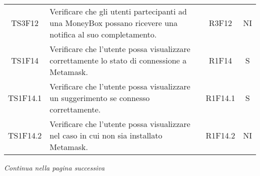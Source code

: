 \begin{table}[H]
\begin{tabular}{c|p{8cm}|c|c}
    TS3F12    & Verificare che gli utenti partecipanti ad una MoneyBox\glo{} possano ricevere una notifica al suo completamento.            & R3F12    & NI \\
    TS1F14    & Verificare che l'utente possa visualizzare correttamente lo stato di connessione a Metamask\glo{}.                          & R1F14    & S \\
    TS1F14.1  & Verificare che l'utente possa visualizzare un suggerimento se connesso correttamente.                                       & R1F14.1  & S \\
    TS1F14.2  & Verificare che l'utente possa visualizzare nel caso in cui non sia installato Metamask\glo{}.                               & R1F14.2  & NI \\
  \end{tabular}
\end{table}
\begin{center}
  \textit{\small Continua nella pagina successiva}
\end{center}
